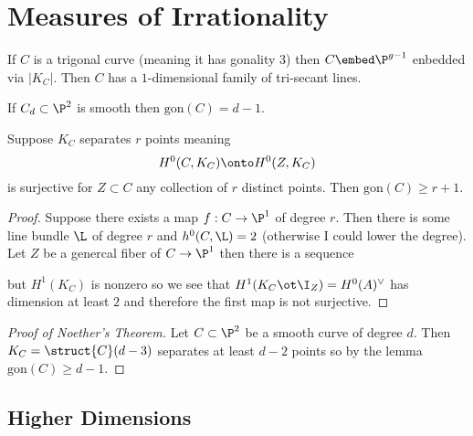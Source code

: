 \documentclass[12pt]{article}
\begin{document}
\section{Measures of Irrationality}

\begin{example}
If $C$ is a trigonal curve (meaning it has gonality $3$) then $C \embed \P^{g-1}$ enbedded via $|K_C|$. Then $C$ has a $1$-dimensional family of tri-secant lines. 
\end{example}

\newcommand{\gon}{\mathrm{gon}}

\begin{theorem}[Noether]
If $C_d \subset \P^2$ is smooth then $\gon(C) = d-1$.
\end{theorem}

\begin{lemma}
Suppose $K_C$ separates $r$ points meaning
\[ H^0(C, K_C) \onto H^0(Z, K_C) \]
is surjective
for $Z \subset C$ any collection of $r$ distinct points. Then $\gon(C) \ge r  + 1$.
\end{lemma}

\begin{proof}
Suppose there exists a map $f : C \to \P^1$ of degree $r$. Then there is some line bundle $\L$ of degree $r$ and $h^0(C, \L) = 2$ (otherwise I could lower the degree). Let $Z$ be a genercal fiber of $C \to \P^1$ then there is a sequence
\begin{center}
\end{center}
but $H^1(K_C)$ is nonzero so we see that $H^1(K_C \ot \I_Z) = H^0(A)^\vee$ has dimension at least $2$ and therefore the first map is not surjective.
\end{proof}

\begin{proof}[Proof of Noether's Theorem]
Let $C \subset \P^2$ be a smooth curve of degree $d$. Then $K_C = \struct{C}(d-3)$ separates at least $d - 2$ points so by the lemma $\gon(C) \ge d - 1$. 
\end{proof}

\subsection{Higher Dimensions}

\newcommand{\irr}{\mathrm{irr}}
\newcommand{\covgon}{\mathrm{covgon}}
\end{document}
